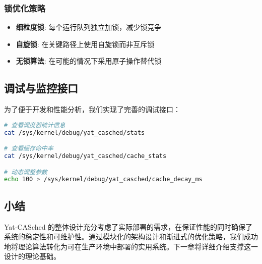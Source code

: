 \subsubsection{锁优化策略}

\begin{itemize}
    \item \textbf{细粒度锁}: 每个运行队列独立加锁，减少锁竞争
    \item \textbf{自旋锁}: 在关键路径上使用自旋锁而非互斥锁
    \item \textbf{无锁算法}: 在可能的情况下采用原子操作替代锁
\end{itemize}

\subsection{调试与监控接口}

为了便于开发和性能分析，我们实现了完善的调试接口：

\begin{lstlisting}[language=bash, caption=debugfs 接口示例]
# 查看调度器统计信息
cat /sys/kernel/debug/yat_casched/stats

# 查看缓存命中率
cat /sys/kernel/debug/yat_casched/cache_stats

# 动态调整参数
echo 100 > /sys/kernel/debug/yat_casched/cache_decay_ms
\end{lstlisting}

\subsection{小结}

Yat-CASched 的整体设计充分考虑了实际部署的需求，在保证性能的同时确保了系统的稳定性和可维护性。通过模块化的架构设计和渐进式的优化策略，我们成功地将理论算法转化为可在生产环境中部署的实用系统。下一章将详细介绍支撑这一设计的理论基础。
